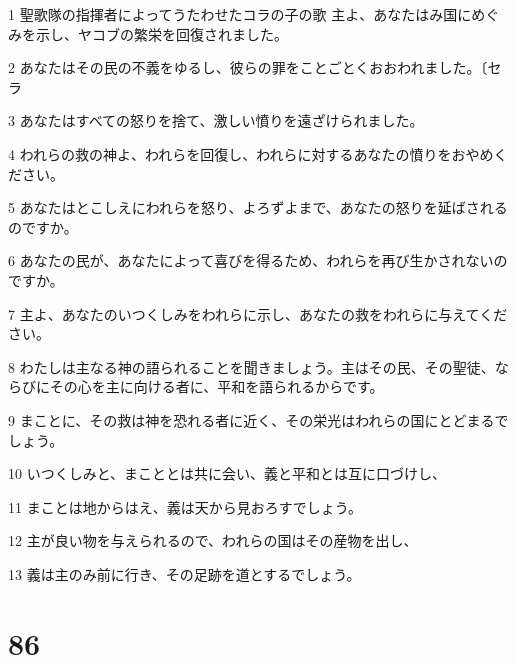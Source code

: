 \par 1 聖歌隊の指揮者によってうたわせたコラの子の歌 主よ、あなたはみ国にめぐみを示し、ヤコブの繁栄を回復されました。
\par 2 あなたはその民の不義をゆるし、彼らの罪をことごとくおおわれました。〔セラ
\par 3 あなたはすべての怒りを捨て、激しい憤りを遠ざけられました。
\par 4 われらの救の神よ、われらを回復し、われらに対するあなたの憤りをおやめください。
\par 5 あなたはとこしえにわれらを怒り、よろずよまで、あなたの怒りを延ばされるのですか。
\par 6 あなたの民が、あなたによって喜びを得るため、われらを再び生かされないのですか。
\par 7 主よ、あなたのいつくしみをわれらに示し、あなたの救をわれらに与えてください。
\par 8 わたしは主なる神の語られることを聞きましょう。主はその民、その聖徒、ならびにその心を主に向ける者に、平和を語られるからです。
\par 9 まことに、その救は神を恐れる者に近く、その栄光はわれらの国にとどまるでしょう。
\par 10 いつくしみと、まこととは共に会い、義と平和とは互に口づけし、
\par 11 まことは地からはえ、義は天から見おろすでしょう。
\par 12 主が良い物を与えられるので、われらの国はその産物を出し、
\par 13 義は主のみ前に行き、その足跡を道とするでしょう。

\chapter{86}

